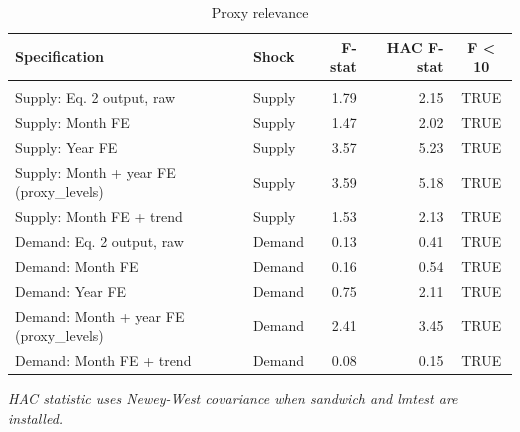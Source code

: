 \begin{table}[t]
\caption*{
{\fontsize{20}{25}\selectfont  Proxy relevance\fontsize{12}{15}\selectfont }
} 
\fontsize{12.0pt}{14.0pt}\selectfont
\begin{tabular*}{\linewidth}{@{\extracolsep{\fill}}llrrc}
\toprule
Specification & Shock & F-stat & HAC F-stat & F < 10 \\ 
\midrule\addlinespace[2.5pt]
\multicolumn{5}{l}{Spain} \\[2.5pt] 
\midrule\addlinespace[2.5pt]
Supply: Eq. 2 output, raw & Supply & 1.79 & 2.15 & TRUE \\ 
Supply: Month FE & Supply & 1.47 & 2.02 & TRUE \\ 
Supply: Year FE & Supply & 3.57 & 5.23 & TRUE \\ 
Supply: Month + year FE (proxy\_levels) & Supply & 3.59 & 5.18 & TRUE \\ 
Supply: Month FE + trend & Supply & 1.53 & 2.13 & TRUE \\ 
Demand: Eq. 2 output, raw & Demand & 0.13 & 0.41 & TRUE \\ 
Demand: Month FE & Demand & 0.16 & 0.54 & TRUE \\ 
Demand: Year FE & Demand & 0.75 & 2.11 & TRUE \\ 
Demand: Month + year FE (proxy\_levels) & Demand & 2.41 & 3.45 & TRUE \\ 
Demand: Month FE + trend & Demand & 0.08 & 0.15 & TRUE \\ 
\bottomrule
\end{tabular*}
\begin{minipage}{\linewidth}
\vspace{.05em}
\emph{HAC statistic uses Newey-West covariance when sandwich and lmtest are installed.}\\
\end{minipage}
\end{table}

